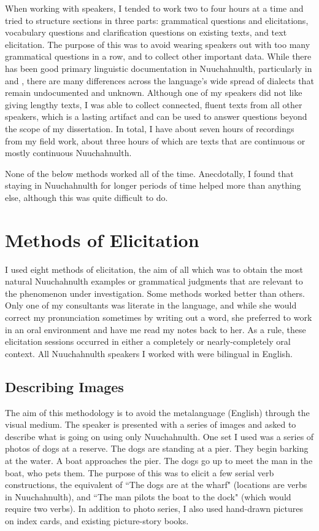 When working with speakers, I tended to work two to four hours at a time and tried to structure sections in three parts: grammatical questions and elicitations, vocabulary questions and clarification questions on existing texts, and text elicitation. The purpose of this was to avoid wearing speakers out with too many grammatical questions in a row, and to collect other important data. While there has been good primary linguistic documentation in Nuuchahnulth, particularly in \cite{sapir1939} and \cite{rose1981}, there are many differences across the language's wide spread of dialects that remain undocumented and unknown. Although one of my speakers did not like giving lengthy texts, I was able to collect connected, fluent texts from all other speakers, which is a lasting artifact and can be used to answer questions beyond the scope of my dissertation. In total, I have about seven hours of recordings from my field work, about three hours of which are texts that are continuous or mostly continuous Nuuchahnulth.

None of the below methods worked all of the time. Anecdotally, I found that staying in Nuuchahnulth for longer periods of time helped more than anything else, although this was quite difficult to do.

\section{Methods of Elicitation}

I used eight methods of elicitation, the aim of all which was to obtain the most natural Nuuchahnulth examples or grammatical judgments that are relevant to the phenomenon under investigation. Some methods worked better than others. Only one of my consultants was literate in the language, and while she would correct my pronunciation sometimes by writing out a word, she preferred to work in an oral environment and have me read my notes back to her. As a rule, these elicitation sessions occurred in either a completely or nearly-completely oral context. All Nuuchahnulth speakers I worked with were bilingual in English.

\subsection{Describing Images}

The aim of this methodology is to avoid the metalanguage (English) through the visual medium. The speaker is presented with a series of images and asked to describe what is going on using only Nuuchahnulth. One set I used was a series of photos of dogs at a reserve. The dogs are standing at a pier. They begin barking at the water. A boat approaches the pier. The dogs go up to meet the man in the boat, who pets them. The purpose of this was to elicit a few serial verb constructions, the equivalent of ``The dogs are at the wharf" (locations are verbs in Nuuchahnulth), and ``The man pilots the boat to the dock" (which would require two verbs). In addition to photo series, I also used hand-drawn pictures on index cards, and existing picture-story books.

